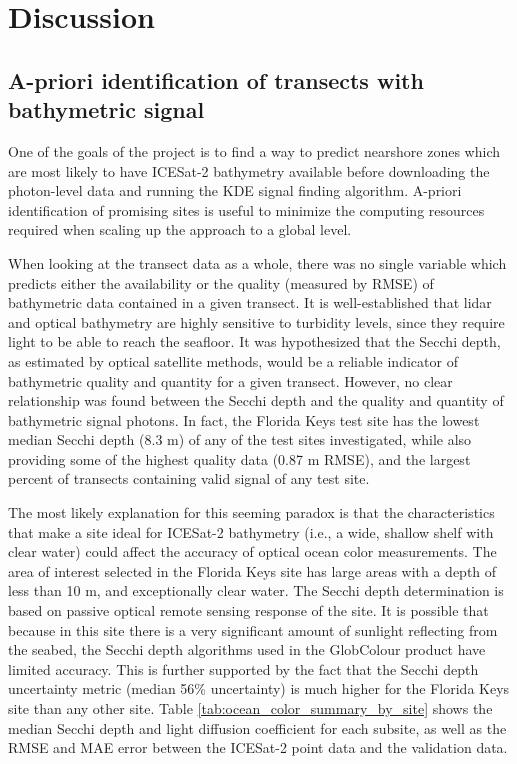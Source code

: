 \chapter{Discussion}

\section{A-priori identification of transects with bathymetric signal}
One of the goals of the project is to find a way to predict nearshore zones which are most likely to have ICESat-2 bathymetry available before downloading the photon-level data and running the KDE signal finding algorithm. A-priori identification of promising sites is useful to minimize the computing resources required when scaling up the approach to a global level.

When looking at the transect data as a whole, there was no single variable which predicts either the availability or the quality (measured by RMSE) of bathymetric data contained in a given transect. It is well-established that lidar and optical bathymetry are highly sensitive to turbidity levels, since they require light to be able to reach the seafloor. It was hypothesized that the Secchi depth, as estimated by optical satellite methods, would be a reliable indicator of bathymetric quality and quantity for a given transect. However, no clear relationship was found between the Secchi depth and the quality and quantity of bathymetric signal photons. In fact, the Florida Keys test site has the lowest median Secchi depth (8.3 m) of any of the test sites investigated, while also providing some of the highest quality data (0.87 m RMSE), and the largest percent of transects containing valid signal of any test site. 

The most likely explanation for this seeming paradox is that the characteristics that make a site ideal for ICESat-2 bathymetry (i.e., a wide, shallow shelf with clear water) could affect the accuracy of optical ocean color measurements. The area of interest selected in the Florida Keys site has large areas with a depth of less than 10 m, and exceptionally clear water. The Secchi depth determination is based on passive optical remote sensing response of the site. It is possible that because in this site there is a very significant amount of sunlight reflecting from the seabed, the Secchi depth algorithms used in the GlobColour product have limited accuracy. This is further supported by the fact that the Secchi depth uncertainty metric (median 56\% uncertainty) is much higher for the Florida Keys site than any other site. Table \ref{tab:ocean_color_summary_by_site} shows the median Secchi depth and light diffusion coefficient for each subsite, as well as the RMSE and MAE error between the ICESat-2 point data and the validation data.


